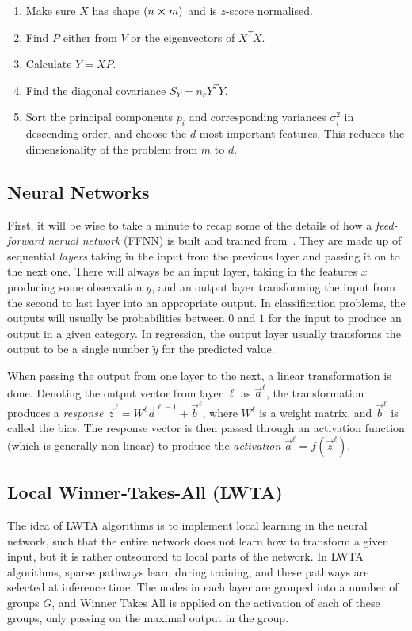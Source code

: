 
    \begin{enumerate}
        \item Make sure $X$ has shape $(n\cross m)$ and is $z$-score normalised.
        \item Find $P$ either from $V$ or the eigenvectors of $X^TX$.
        \item Calculate $Y=XP$.
        \item Find the diagonal covariance $S_Y=n_cY^TY$.
        \item Sort the principal components $p_i$ and corresponding variances $\sigma^2_i$ in descending order, and choose the $d$ most important features. This reduces the dimensionality of the problem from $m$ to $d$.
    \end{enumerate}



     

\subsection{Neural Networks}
    First, it will be wise to take a minute to recap some of the details of how a \textit{feed-forward nerual network} (FFNN) is built and trained from~\cite{Project2}. They are made up of sequential \textit{layers} taking in the input from the previous layer and passing it on to the next one. There will always be an input layer, taking in the features $x$ producing some observation $y$, and an output layer transforming the input from the second to last layer into an appropriate output. In classification problems, the outputs will usually be probabilities between $0$ and $1$ for the input to produce an output in a given category. In regression, the output layer usually transforms the output to be a single number $\tilde{y}$ for the predicted value.

    When passing the output from one layer to the next, a linear transformation is done. Denoting the output vector from layer $\ell$ as $\vec{a}^\ell$, the transformation produces a \textit{response} $\vec{z}^{\ell} = W^\ell \vec{a}^{\ell-1} + \vec{b}^\ell$, where $W^\ell$ is a weight matrix, and $\vec{b}^\ell$ is called the bias. The response vector is then passed through an activation function (which is generally non-linear) to produce the \textit{activation} $\vec{a}^\ell = f(\vec{z}^\ell)$.

\subsection{Local Winner-Takes-All (LWTA)}
    The idea of LWTA algorithms is to implement local learning in the neural network, such that the entire network does not learn how to transform a given input, but it is rather outsourced to local parts of the network. In LWTA algorithms, sparse pathways learn during training, and these pathways are selected at inference time. The nodes in each layer are grouped into a number of groups $G$, and Winner Takes All is applied on the activation of each of these groups, only passing on the maximal output in the group.


